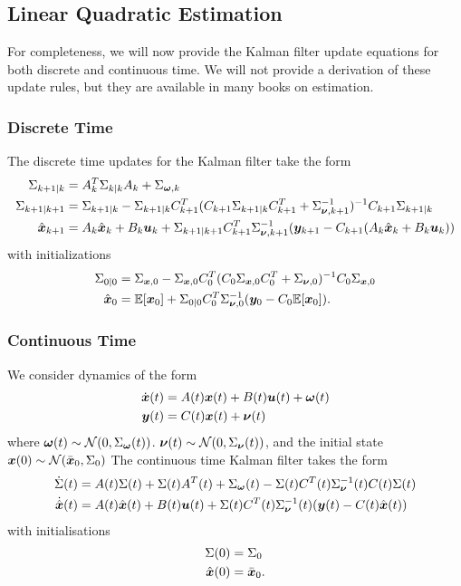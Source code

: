 
\subsection{Linear Quadratic Estimation}


For completeness, we will now provide the Kalman filter update equations for both discrete and continuous time. We will not provide a derivation of these update rules, but they are available in many books on estimation.

\subsubsection{Discrete Time}

The discrete time updates for the Kalman filter take the form
\begin{align}
    \Sigma_{k+1|k} &= A^T_k \Sigma_{k|k} A_k + \Sigma_{\bm{\omega},k} \\ 
    \Sigma_{k+1|k+1} &= \Sigma_{k+1|k} - \Sigma_{k+1|k} C^T_{k+1} (C_{k+1} \Sigma_{k+1|k} C^T_{k+1} + \Sigma^{-1}_{\bm{\nu},k+1})^{-1} C_{k+1} \Sigma_{k+1|k} \\
    \hat{\bm{x}}_{k+1} &= A_k \hat{\bm{x}}_k + B_k \bm{u}_k + \Sigma_{k+1|k+1} C^T_{k+1} \Sigma^{-1}_{\bm{\nu},k+1} (\bm{y}_{k+1} - C_{k+1} (A_k \hat{\bm{x}}_k + B_k \bm{u}_k))
\end{align}
with initializations
\begin{align}
    \Sigma_{0|0} &= \Sigma_{\bm{x},0} -  \Sigma_{\bm{x},0} C^T_0 ( C_0 \Sigma_{\bm{x},0} C^T_0 + \Sigma_{\bm{\nu},0})^{-1} C_0  \Sigma_{\bm{x},0}\\
    \hat{\bm{x}}_0 &= \mathbb{E}[\bm{x}_0] + \Sigma_{0|0} C_0^T \Sigma_{\bm{\nu}, 0}^{-1} (\bm{y}_0 - C_0 \mathbb{E}[\bm{x}_0]).
\end{align}

\subsubsection{Continuous Time}

We consider dynamics of the form
\begin{align}
    \dot{\bm{x}}(t) &= A(t) \bm{x}(t) + B(t) \bm{u}(t) + \bm{\omega}(t)\\
    \bm{y}(t) &= C(t) \bm{x}(t) + \bm{\nu}(t)
\end{align}
where $\bm{\omega}(t) \sim \mathcal{N}(0, \Sigma_{\bm{\omega}}(t))$. $\bm{\nu}(t) \sim \mathcal{N}(0, \Sigma_{\bm{\nu}}(t))$, and the initial state $\bm{x}(0) \sim \mathcal{N}(\bar{\bm{x}}_0, \Sigma_0)$ The continuous time Kalman filter takes the form
\begin{align}
\dot{\Sigma}(t) &=  A(t) \Sigma(t) + \Sigma(t) A^T(t) + \Sigma_{\bm{\omega}}(t) - \Sigma(t) C^T(t) \Sigma_{\bm{\nu}}^{-1}(t) C(t) \Sigma(t)\\
    \dot{\hat{\bm{x}}}(t) &= A(t) \hat{\bm{x}}(t) + B(t) \bm{u}(t) + \Sigma(t) C^T(t) \Sigma_{\bm{\nu}}^{-1}(t) (\bm{y}(t) - C(t) \hat{\bm{x}}(t))
\end{align}
with initialisations
\begin{align}
    \Sigma(0) &= \Sigma_0\\
    \hat{\bm{x}}(0) &= \bar{\bm{x}}_0.
\end{align}

